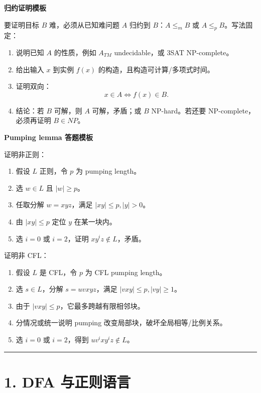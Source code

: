 ﻿\documentclass[UTF8,11pt]{ctexart}
\begin{document}
\textbf{归约证明模板}


要证明目标 \(B\) 难，必须从已知难问题 \(A\) 归约到 \(B\)：\(A\le_m B\) 或 \(A\le_p B\)。写法固定：


\begin{enumerate}
\item 说明已知 \(A\) 的性质，例如 \(A_{TM}\) undecidable，或 3SAT NP-complete。
\item 给出输入 \(x\) 到实例 \(f(x)\) 的构造，且构造可计算/多项式时间。
\item 证明双向：
\[
   x\in A \iff f(x)\in B.
   \]

\item 结论：若 \(B\) 可解，则 \(A\) 可解，矛盾；或 \(B\) NP-hard。若还要 NP-complete，必须再证明 \(B\in NP\)。
\end{enumerate}


\textbf{Pumping lemma 答题模板}


证明非正则：


\begin{enumerate}
\item 假设 \(L\) 正则，令 \(p\) 为 pumping length。
\item 选 \(w\in L\) 且 \(|w|\ge p\)。
\item 任取分解 \(w=xyz\)，满足 \(|xy|\le p, |y|>0\)。
\item 由 \(|xy|\le p\) 定位 \(y\) 在某一块内。
\item 选 \(i=0\) 或 \(i=2\)，证明 \(xy^iz\notin L\)，矛盾。
\end{enumerate}


证明非 CFL：


\begin{enumerate}
\item 假设 \(L\) 是 CFL，令 \(p\) 为 CFL pumping length。
\item 选 \(s\in L\)，分解 \(s=uvxyz\)，满足 \(|vxy|\le p, |vy|\ge 1\)。
\item 由于 \(|vxy|\le p\)，它最多跨越有限相邻块。
\item 分情况或统一说明 pumping 改变局部块，破坏全局相等/比例关系。
\item 选 \(i=0\) 或 \(i=2\)，得到 \(uv^ixy^iz\notin L\)。
\end{enumerate}


\bigskip\hrule\bigskip


\section{1. DFA 与正则语言}
\end{document}

